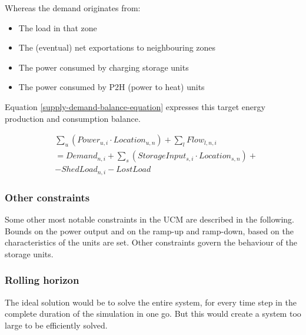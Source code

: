 Whereas the demand originates from:
\begin{itemize}
    \item The load in that zone
    \item The (eventual) net exportations to neighbouring zones
    \item The power consumed by charging storage units
    \item The power consumed by P2H (power to heat) units
\end{itemize}

Equation \ref{supply-demand-balance-equation} expresses this target energy production and consumption balance.

\begin{captionnable}[h]
    \begin{equation}
        \begin{split}
            &\sum_{u} (Power_{u,i} \cdot Location_{u,n}) + \sum_{l} Flow_{l,n,i} \\
            & = Demand_{n,i} + \sum_{s} (StorageInput_{s,i} \cdot Location_{s,n}) + \\
            & - ShedLoad_{n,i} - LostLoad 		
        \end{split}
        \label{supply-demand-balance-equation}
    \end{equation}
\end{captionnable}

\subsubsection{Other constraints}

Some other most notable constraints in the UCM are described in the following. Bounds on the power output and on the ramp-up and ramp-down, based on the characteristics of the units are set. Other constraints govern the behaviour of the storage units.

\subsubsection{Rolling horizon}

The ideal solution would be to solve the entire system, for every time step in the complete duration of the simulation in one go. But this would create a system too large to be efficiently solved.

